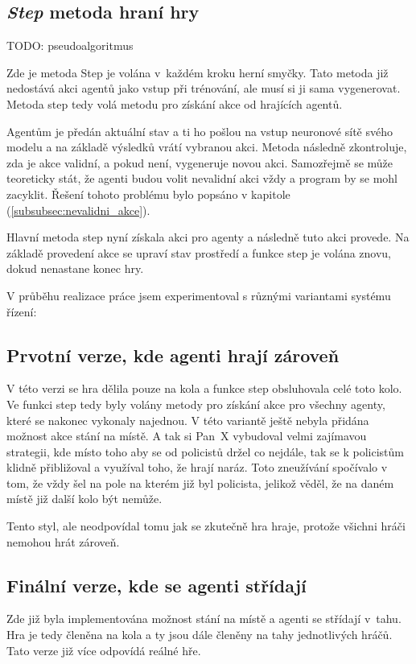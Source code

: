 \subsection{\emph{Step} metoda hraní hry}
{\color{red}TODO: pseudoalgoritmus}
%

Zde je metoda Step je volána v~každém kroku  herní smyčky.
Tato metoda již nedostává akci agentů jako vstup při trénování, ale musí si ji sama vygenerovat.
Metoda step tedy volá metodu pro získání akce od hrajících agentů.

Agentům je předán aktuální stav a ti ho pošlou na vstup neuronové sítě svého modelu a na základě výsledků vrátí vybranou akci.
Metoda následně zkontroluje, zda je akce validní, a pokud není, vygeneruje novou akci.
Samozřejmě se může teoreticky stát, že agenti budou volit nevalidní akci vždy a program by se mohl zacyklit.
Řešení tohoto problému bylo popsáno v kapitole  (\ref{subsubsec:nevalidni_akce}).

Hlavní metoda step nyní získala akci pro agenty a následně tuto akci provede.
Na základě provedení akce se upraví stav prostředí a funkce step je volána znovu, dokud nenastane konec hry.

\bigskip
\bigskip

V průběhu realizace práce jsem experimentoval s různými variantami systému řízení:
\subsection{Prvotní verze, kde agenti hrají zároveň}
V této verzi se hra dělila pouze na kola a funkce step obsluhovala celé toto kolo.
Ve funkci step tedy byly volány metody pro získání akce pro všechny agenty, které se nakonec vykonaly najednou.
V této variantě ještě nebyla přidána možnost akce stání na místě.
A tak si Pan~X vybudoval velmi zajímavou strategii, kde místo toho aby se od policistů držel co nejdále, tak se k policistům klidně přibližoval a využíval toho, že hrají naráz.
Toto zneužívání spočívalo v tom, že vždy šel na pole na kterém již byl policista, jelikož věděl, že na daném místě již další kolo být nemůže.

Tento styl, ale neodpovídal tomu jak se zkutečně hra hraje, protože všichni hráči nemohou hrát zároveň.
\subsection{Finální verze, kde se agenti střídají}
Zde již byla implementována možnost stání na místě a agenti se střídají v~tahu.
Hra je tedy členěna na kola a ty jsou dále členěny na tahy jednotlivých hráčů.
Tato verze již více odpovídá reálné hře.

